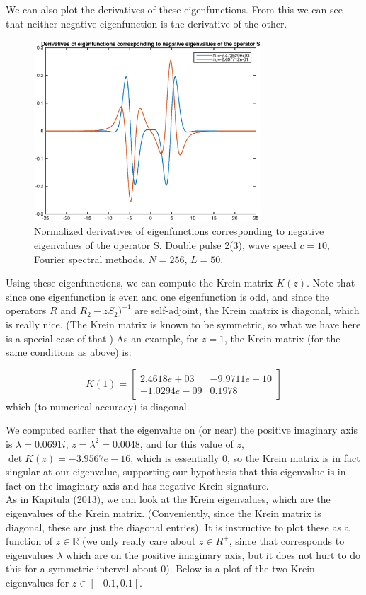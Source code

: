 \documentclass[12pt]{article}
\def\R{{\mathbb R}}
\begin{document}
We can also plot the derivatives of these eigenfunctions. From this we can see that neither negative eigenfunction is the derivative of the other.

\begin{figure}[H]
	\includegraphics[width=8.5cm]{dp2dvNeg}
	\caption{Normalized derivatives of eigenfunctions corresponding to negative eigenvalues of the operator S. Double pulse 2(3), wave speed $c = 10$, Fourier spectral methods, $N = 256$, $L = 50$.}
\end{figure}



Using these eigenfunctions, we can compute the Krein matrix $K(z)$. Note that since one eigenfunction is even and one eigenfunction is odd, and since the operators $R$ and $R_2 - zS_2 )^{-1}$ are self-adjoint, the Krein matrix is diagonal, which is really nice. (The Krein matrix is known to be symmetric, so what we have here is a special case of that.) As an example, for $z = 1$, the Krein matrix (for the same conditions as above) is:

\[
K(1) = \begin{bmatrix}
2.4618e+03 & -9.9711e-10 \\ -1.0294e-09 & 0.1978
\end{bmatrix}
\]
which (to numerical accuracy) is diagonal.

We computed earlier that the eigenvalue on (or near) the positive imaginary axis is $\lambda = 0.0691i$; $z = \lambda^2 = 0.0048$, and for this value of $z$, $\det K(z) = -3.9567e-16$, which is essentially 0, so the Krein matrix is in fact singular at our eigenvalue, supporting our hypothesis that this eigenvalue is in fact on the imaginary axis and has negative Krein signature. \\

As in Kapitula (2013), we can look at the Krein eigenvalues, which are the eigenvalues of the Krein matrix. (Conveniently, since the Krein matrix is diagonal, these are just the diagonal entries). It is instructive to plot these as a function of $z \in \R$ (we only really care about $z \in R^+$, since that corresponds to eigenvalues $\lambda$ which are on the positive imaginary axis, but it does not hurt to do this for a symmetric interval about 0). Below is a plot of the two Krein eigenvalues for $z \in [-0.1, 0.1]$.
\end{document}
